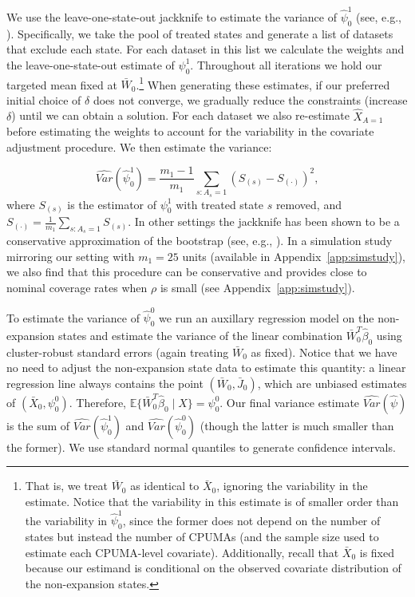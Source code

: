 \documentclass[aoas]{imsart}
\theoremstyle{plain}
\theoremstyle{remark}
\begin{document}
We use the leave-one-state-out jackknife to estimate the variance of $\hat{\psi}_0^1$ (see, e.g., \cite{cameron2015practitioner}). Specifically, we take the pool of treated states and generate a list of datasets that exclude each state. For each dataset in this list we calculate the weights and the leave-one-state-out estimate of $\psi_0^1$. Throughout all iterations we hold our targeted mean fixed at $\bar{W}_0$.\footnote{That is, we treat $\bar{W}_0$ as identical to $\bar{X}_0$, ignoring the variability in the estimate. Notice that the variability in this estimate is of smaller order than the variability in $\hat{\psi}_0^1$, since the former does not depend on the number of states but instead the number of CPUMAs (and the sample size used to estimate each CPUMA-level covariate). Additionally, recall that $\bar{X}_0$ is fixed because our estimand is conditional on the observed covariate distribution of the non-expansion states.} When generating these estimates, if our preferred initial choice of $\delta$ does not converge, we gradually reduce the constraints (increase $\delta$) until we can obtain a solution. For each dataset we also re-estimate $\hat{X}_{A=1}$ before estimating the weights to account for the variability in the covariate adjustment procedure. We then estimate the variance:

\[ \hat{Var}(\hat{\psi}_0^1) = \frac{m_1 - 1}{m_1} \sum_{s:A_s = 1} \left( S_{(s)} - S_{(\cdot)} \right)^2,\]
%
where $S_{(s)}$ is the estimator of $\psi_0^1$ with treated state $s$ removed, and $S_{(\cdot)} = \frac{1}{m_1} \sum_{s:A_s=1} S_{(s)}$. In other settings the jackknife has been shown to be a conservative approximation of the bootstrap (see, e.g., \cite{efron1981jackknife}). In a simulation study mirroring our setting with $m_1 = 25$ units (available in Appendix~\ref{app:simstudy}), we also find that this procedure can be conservative and provides close to nominal coverage rates when $\rho$ is small (see Appendix~\ref{app:simstudy}).

To estimate the variance of $\hat{\psi}_0^0$ we run an auxillary regression model on the non-expansion states and estimate the variance of the linear combination $\bar{W}_0^T\hat{\beta}_0$ using cluster-robust standard errors (again treating $\bar{W}_0$ as fixed). Notice that we have no need to adjust the non-expansion state data to estimate this quantity: a linear regression line always contains the point $(\bar{W}_0, \bar{J}_0)$, which are unbiased estimates of $(\bar{X}_0, \psi_0^0)$. Therefore, $\mathbb{E}\{\bar{W}_0^T\hat{\beta}_0 \mid X\} = \psi_0^0$. Our final variance estimate $\hat{Var}(\hat{\psi})$ is the sum of $\hat{Var}(\hat{\psi}_0^1)$ and $\hat{Var}(\hat{\psi}_0^0)$ (though the latter is much smaller than the former). We use standard normal quantiles to generate confidence intervals.
\end{document}
